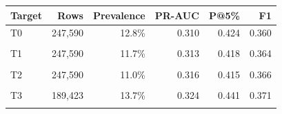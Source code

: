 \begin{tabular}{@{}lrrrrr@{}}
\toprule
Target & Rows & Prevalence & PR-AUC & P@5\% & F1 \\
\midrule
T0 & 247,590 & 12.8\% & 0.310 & 0.424 & 0.360 \\\\
T1 & 247,590 & 11.7\% & 0.313 & 0.418 & 0.364 \\\\
T2 & 247,590 & 11.0\% & 0.316 & 0.415 & 0.366 \\\\
T3 & 189,423 & 13.7\% & 0.324 & 0.441 & 0.371 \\\\
\bottomrule
\end{tabular}
